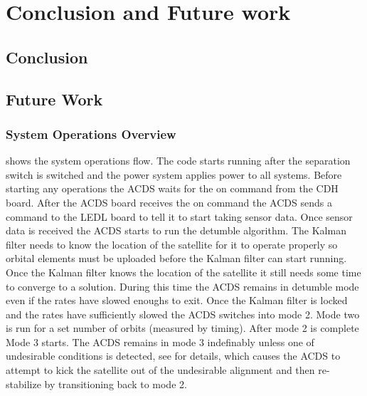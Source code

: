
\chapter{Conclusion and Future work}

\section{Conclusion}

\section{Future Work}

\subsection{System Operations Overview}

 shows the system operations flow. The code starts running after the separation switch is switched and the power system applies power to all systems. Before starting any operations the \ac{ACDS} waits for the on command from the \ac{CDH} board. After the \ac{ACDS} board receives the on command the \ac{ACDS} sends a command to the \ac{LEDL} board to tell it to start taking sensor data. Once sensor data is received the \ac{ACDS} starts to run the detumble algorithm. The Kalman filter needs to know the location of the satellite for it to operate properly so orbital elements must be uploaded before the Kalman filter can start running. Once the Kalman filter knows the location of the satellite it still needs some time to converge to a solution. During this time the \ac{ACDS} remains in detumble mode even if the rates have slowed enoughs to exit. Once the Kalman filter is locked and the rates have sufficiently slowed the \ac{ACDS} switches into mode 2. Mode two is run for a set number  of orbits (measured by timing). After mode 2 is complete Mode 3 starts. The \ac{ACDS} remains in mode 3 indefinably unless one of undesirable conditions is detected, see \cite{Mentch11} for details, which causes the \ac{ACDS} to attempt to kick the satellite out of the undesirable alignment and then re-stabilize by transitioning back to mode 2.

